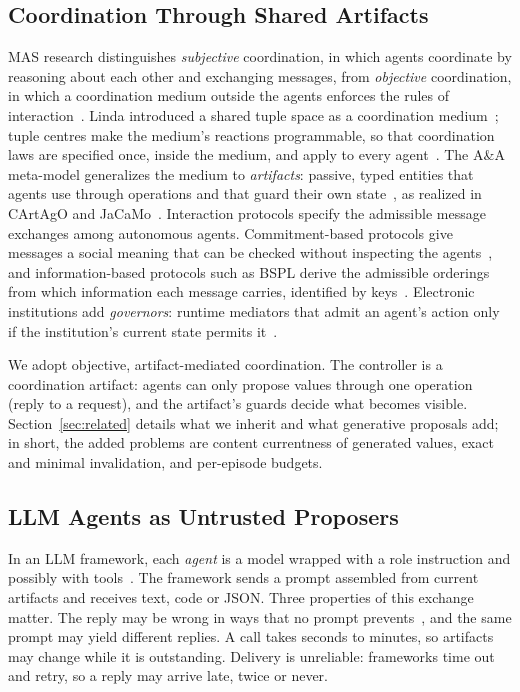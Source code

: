 \subsection{Coordination Through Shared Artifacts}\label{sec:bg-mas}
MAS research distinguishes \emph{subjective} coordination, in which agents coordinate by reasoning about each other and exchanging messages, from \emph{objective} coordination, in which a coordination medium outside the agents enforces the rules of interaction~\cite{omicini2001coordination}. Linda introduced a shared tuple space as a coordination medium~\cite{gelernter1985linda,gelernter1992coordination}; tuple centres make the medium's reactions programmable, so that coordination laws are specified once, inside the medium, and apply to every agent~\cite{omicini2001tuple}. The A\&A meta-model generalizes the medium to \emph{artifacts}: passive, typed entities that agents use through operations and that guard their own state~\cite{omicini2008artifacts,weyns2007environment}, as realized in CArtAgO and JaCaMo~\cite{ricci2011environment,boissier2013jacamo}. Interaction protocols specify the admissible message exchanges among autonomous agents. Commitment-based protocols give messages a social meaning that can be checked without inspecting the agents~\cite{singh1998acl,yolum2002commitments}, and information-based protocols such as BSPL derive the admissible orderings from which information each message carries, identified by keys~\cite{singh2011bspl,chopra2020protocols}. Electronic institutions add \emph{governors}: runtime mediators that admit an agent's action only if the institution's current state permits it~\cite{esteva2001institutions,arcos2005institutions,boella2006normative}.

We adopt objective, artifact-mediated coordination. The controller is a coordination artifact: agents can only propose values through one operation (reply to a request), and the artifact's guards decide what becomes visible. Section~\ref{sec:related} details what we inherit and what generative proposals add; in short, the added problems are content currentness of generated values, exact and minimal invalidation, and per-episode budgets.

\subsection{LLM Agents as Untrusted Proposers}\label{sec:bg-agents}
In an LLM framework, each \emph{agent} is a model wrapped with a role instruction and possibly with tools~\cite{metagpt,chatdev,autogen}. The framework sends a prompt assembled from current artifacts and receives text, code or JSON. Three properties of this exchange matter. The reply may be wrong in ways that no prompt prevents~\cite{ji2023hallucination}, and the same prompt may yield different replies. A call takes seconds to minutes, so artifacts may change while it is outstanding. Delivery is unreliable: frameworks time out and retry, so a reply may arrive late, twice or never.

